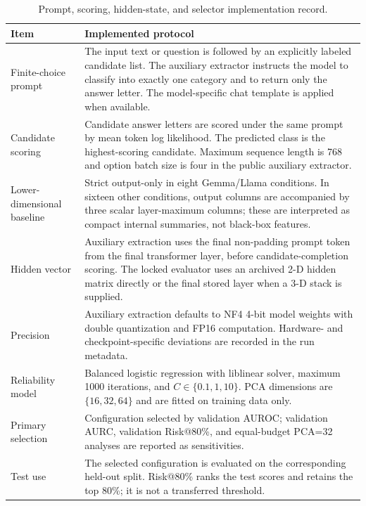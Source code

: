 \begin{table}[H]
\centering
\small
\caption{Prompt, scoring, hidden-state, and selector implementation record.}
\label{tab:prompt-extraction-protocol}
\begin{tabularx}{\textwidth}{p{}X}
\toprule
Item & Implemented protocol \\
\midrule
Finite-choice prompt & The input text or question is followed by an explicitly labeled candidate list. The auxiliary extractor instructs the model to classify into exactly one category and to return only the answer letter. The model-specific chat template is applied when available. \\
Candidate scoring & Candidate answer letters are scored under the same prompt by mean token log likelihood. The predicted class is the highest-scoring candidate. Maximum sequence length is 768 and option batch size is four in the public auxiliary extractor. \\
Lower-dimensional baseline & Strict output-only in eight Gemma/Llama conditions. In sixteen other conditions, output columns are accompanied by three scalar layer-maximum columns; these are interpreted as compact internal summaries, not black-box features. \\
Hidden vector & Auxiliary extraction uses the final non-padding prompt token from the final transformer layer, before candidate-completion scoring. The locked evaluator uses an archived 2-D hidden matrix directly or the final stored layer when a 3-D stack is supplied. \\
Precision & Auxiliary extraction defaults to NF4 4-bit model weights with double quantization and FP16 computation. Hardware- and checkpoint-specific deviations are recorded in the run metadata. \\
Reliability model & Balanced logistic regression with liblinear solver, maximum 1000 iterations, and $C\in\{0.1,1,10\}$. PCA dimensions are $\{16,32,64\}$ and are fitted on training data only. \\
Primary selection & Configuration selected by validation AUROC; validation AURC, validation Risk@80\%, and equal-budget PCA=32 analyses are reported as sensitivities. \\
Test use & The selected configuration is evaluated on the corresponding held-out split. Risk@80\% ranks the test scores and retains the top 80\%; it is not a transferred threshold. \\
\bottomrule
\end{tabularx}
\end{table}
